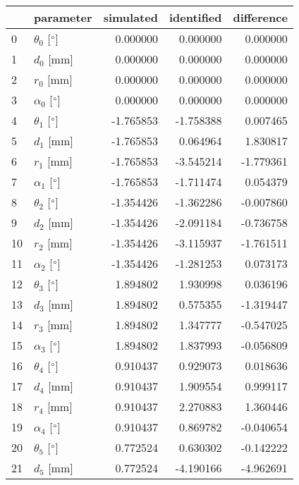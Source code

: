 \documentclass{standalone}%
\begin{document}
%
\normalsize%
\begin{tabular}{llrrr}
\toprule
{} &                 parameter & simulated & identified & difference \\
\midrule
0  &  $\theta_{0}$ [$\degree$] &  0.000000 &   0.000000 &   0.000000 \\
1  &              $d_{0}$ [mm] &  0.000000 &   0.000000 &   0.000000 \\
2  &              $r_{0}$ [mm] &  0.000000 &   0.000000 &   0.000000 \\
3  &  $\alpha_{0}$ [$\degree$] &  0.000000 &   0.000000 &   0.000000 \\
4  &  $\theta_{1}$ [$\degree$] & -1.765853 &  -1.758388 &   0.007465 \\
5  &              $d_{1}$ [mm] & -1.765853 &   0.064964 &   1.830817 \\
6  &              $r_{1}$ [mm] & -1.765853 &  -3.545214 &  -1.779361 \\
7  &  $\alpha_{1}$ [$\degree$] & -1.765853 &  -1.711474 &   0.054379 \\
8  &  $\theta_{2}$ [$\degree$] & -1.354426 &  -1.362286 &  -0.007860 \\
9  &              $d_{2}$ [mm] & -1.354426 &  -2.091184 &  -0.736758 \\
10 &              $r_{2}$ [mm] & -1.354426 &  -3.115937 &  -1.761511 \\
11 &  $\alpha_{2}$ [$\degree$] & -1.354426 &  -1.281253 &   0.073173 \\
12 &  $\theta_{3}$ [$\degree$] &  1.894802 &   1.930998 &   0.036196 \\
13 &              $d_{3}$ [mm] &  1.894802 &   0.575355 &  -1.319447 \\
14 &              $r_{3}$ [mm] &  1.894802 &   1.347777 &  -0.547025 \\
15 &  $\alpha_{3}$ [$\degree$] &  1.894802 &   1.837993 &  -0.056809 \\
16 &  $\theta_{4}$ [$\degree$] &  0.910437 &   0.929073 &   0.018636 \\
17 &              $d_{4}$ [mm] &  0.910437 &   1.909554 &   0.999117 \\
18 &              $r_{4}$ [mm] &  0.910437 &   2.270883 &   1.360446 \\
19 &  $\alpha_{4}$ [$\degree$] &  0.910437 &   0.869782 &  -0.040654 \\
20 &  $\theta_{5}$ [$\degree$] &  0.772524 &   0.630302 &  -0.142222 \\
21 &              $d_{5}$ [mm] &  0.772524 &  -4.190166 &  -4.962691 \\

\end{tabular}
\end{document}
